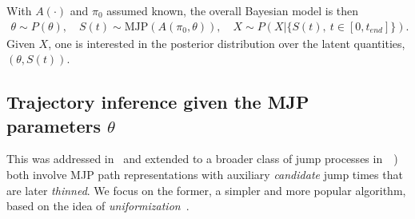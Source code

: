 With $A(\cdot)$ and $\pi_0$ assumed known, the overall Bayesian model is then 
\begin{align}
  \label{eq:bayes_model}
  \theta \sim P(\theta), \quad S(t) \sim \text{MJP}(A(\pi_0, \theta)), \quad X \sim P(X|\{S(t),\ t \in [0,t_{end}]\}).
\end{align}
Given $X$, one is interested in the posterior distribution over the latent quantities, $(\theta,S(t))$. 

\subsection{Trajectory inference given the MJP parameters $\theta$}
This was addressed in~\citet{RaoTeh13}  and extended to a broader class of jump processes in~\cite{RaoTeh12}~\citep[also see][]{FearnSher2006, Hobolth09, Elhaygibbssampling}) 
\citet{RaoTeh13,RaoTeh12} both involve MJP path representations with auxiliary {\em candidate} jump times that are later {\em thinned}.  
We focus on the former, a simpler and more popular algorithm, based on the idea of {\em uniformization}~\citep{Jen1953}. 

